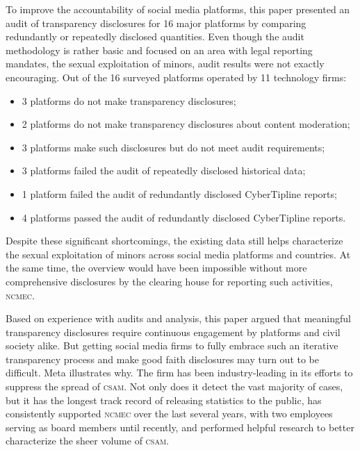 \documentclass[nonacm,screen]{acmart}
\newcommand\V[1]{\textsc{\MakeLowercase{#1}}}
\begin{document}
\begin{itemize}
{To improve the accountability of social media platforms, this paper presented an
audit of transparency disclosures for 16 major platforms by comparing
redundantly or repeatedly disclosed quantities. Even though the audit
methodology is rather basic and focused on an area with legal reporting
mandates, the sexual exploitation of minors, audit results were not exactly
encouraging. Out of the 16 surveyed platforms operated by 11 technology firms:
\begin{itemize}
\item[\ding{56}] 3 platforms do not make transparency disclosures;
\item[\ding{56}] 2 platforms do not make transparency disclosures about content moderation;
\item[\ding{56}] 3 platforms make such disclosures but do not meet audit requirements;
\item[\ding{56}] 3 platforms failed the audit of repeatedly disclosed historical data;
\item[\ding{56}] 1 platform failed the audit of redundantly disclosed CyberTipline reports;
\item[\ding{52}] 4 platforms passed the audit of redundantly disclosed CyberTipline reports.
\end{itemize}
Despite these significant shortcomings, the existing data still helps
characterize the sexual exploitation of minors across social media platforms and
countries. At the same time, the overview would have been impossible without
more comprehensive disclosures by the clearing house for reporting such
activities, \V{NCMEC}.

Based on experience with audits and analysis, this paper argued that meaningful
transparency disclosures require continuous engagement by platforms and civil
society alike. But getting social media firms to fully embrace such an iterative
transparency process and make good faith disclosures may turn out to be
difficult. Meta illustrates why. The firm has been industry-leading in its
efforts to suppress the spread of \V{CSAM}. Not only does it detect the vast
majority of cases, but it has the longest track record of releasing statistics
to the public, has consistently supported \V{NCMEC} over the last several years,
with two employees serving as board members until recently, and performed
helpful research to better characterize the sheer volume of \V{CSAM}.

}
\end{itemize}
\end{document}
